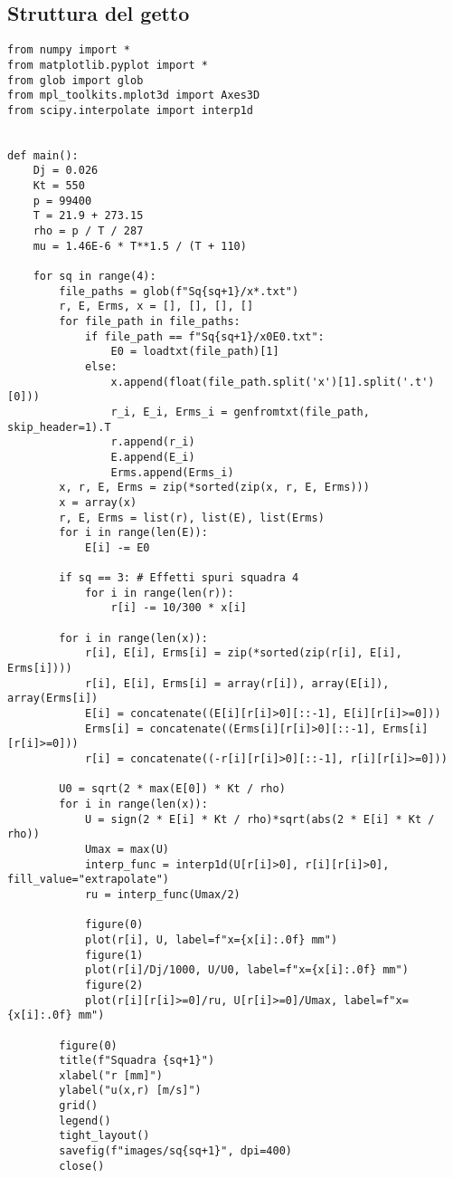 \subsection{Struttura del getto}\label{b3}
\begin{lstlisting}
from numpy import *
from matplotlib.pyplot import *
from glob import glob
from mpl_toolkits.mplot3d import Axes3D
from scipy.interpolate import interp1d


def main():
    Dj = 0.026
    Kt = 550
    p = 99400
    T = 21.9 + 273.15
    rho = p / T / 287
    mu = 1.46E-6 * T**1.5 / (T + 110)

    for sq in range(4):
        file_paths = glob(f"Sq{sq+1}/x*.txt")
        r, E, Erms, x = [], [], [], []
        for file_path in file_paths:
            if file_path == f"Sq{sq+1}/x0E0.txt":
                E0 = loadtxt(file_path)[1]
            else:
                x.append(float(file_path.split('x')[1].split('.t')[0]))
                r_i, E_i, Erms_i = genfromtxt(file_path, skip_header=1).T
                r.append(r_i)
                E.append(E_i)
                Erms.append(Erms_i)
        x, r, E, Erms = zip(*sorted(zip(x, r, E, Erms)))
        x = array(x)
        r, E, Erms = list(r), list(E), list(Erms)
        for i in range(len(E)):
            E[i] -= E0

        if sq == 3: # Effetti spuri squadra 4
            for i in range(len(r)):
                r[i] -= 10/300 * x[i]

        for i in range(len(x)):
            r[i], E[i], Erms[i] = zip(*sorted(zip(r[i], E[i], Erms[i])))
            r[i], E[i], Erms[i] = array(r[i]), array(E[i]), array(Erms[i])
            E[i] = concatenate((E[i][r[i]>0][::-1], E[i][r[i]>=0]))
            Erms[i] = concatenate((Erms[i][r[i]>0][::-1], Erms[i][r[i]>=0]))
            r[i] = concatenate((-r[i][r[i]>0][::-1], r[i][r[i]>=0]))

        U0 = sqrt(2 * max(E[0]) * Kt / rho)
        for i in range(len(x)):
            U = sign(2 * E[i] * Kt / rho)*sqrt(abs(2 * E[i] * Kt / rho))
            Umax = max(U)
            interp_func = interp1d(U[r[i]>0], r[i][r[i]>0], fill_value="extrapolate")
            ru = interp_func(Umax/2)

            figure(0)
            plot(r[i], U, label=f"x={x[i]:.0f} mm")
            figure(1)
            plot(r[i]/Dj/1000, U/U0, label=f"x={x[i]:.0f} mm")
            figure(2)
            plot(r[i][r[i]>=0]/ru, U[r[i]>=0]/Umax, label=f"x={x[i]:.0f} mm")

        figure(0)
        title(f"Squadra {sq+1}")
        xlabel("r [mm]")
        ylabel("u(x,r) [m/s]")
        grid()
        legend()
        tight_layout()
        savefig(f"images/sq{sq+1}", dpi=400)
        close()


\end{lstlisting}

